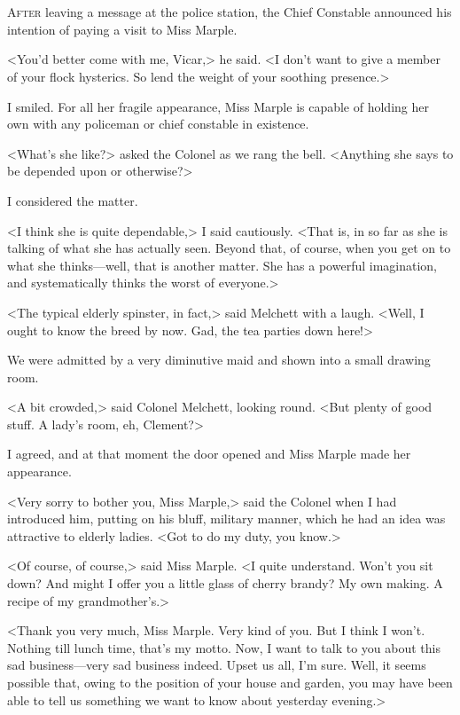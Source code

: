 \chapter[Chapter  \thechapter]{}


\lettrine{A}{fter} leaving a message at the police station, the Chief Constable announced his intention of paying a visit to Miss Marple.

\zz
<You'd better come with me, Vicar,> he said. <I don't want to give a member of your flock hysterics. So lend the weight of your soothing presence.>

I smiled. For all her fragile appearance, Miss Marple is capable of holding her own with any policeman or chief constable in existence.

<What's she like?> asked the Colonel as we rang the bell. <Anything she says to be depended upon or otherwise?>

I considered the matter.

<I think she is quite dependable,> I said cautiously. <That is, in so far as she is talking of what she has actually seen. Beyond that, of course, when you get on to what she thinks—well, that is another matter. She has a powerful imagination, and systematically thinks the worst of everyone.>

<The typical elderly spinster, in fact,> said Melchett with a laugh. <Well, I ought to know the breed by now. Gad, the tea parties down here!>

We were admitted by a very diminutive maid and shown into a small drawing room.

<A bit crowded,> said Colonel Melchett, looking round. <But plenty of good stuff. A lady's room, eh, Clement?>

I agreed, and at that moment the door opened and Miss Marple made her appearance.

<Very sorry to bother you, Miss Marple,> said the Colonel when I had introduced him, putting on his bluff, military manner, which he had an idea was attractive to elderly ladies. <Got to do my duty, you know.>

<Of course, of course,> said Miss Marple. <I quite understand. Won't you sit down? And might I offer you a little glass of cherry brandy? My own making. A recipe of my grandmother's.>

<Thank you very much, Miss Marple. Very kind of you. But I think I won't. Nothing till lunch time, that's my motto. Now, I want to talk to you about this sad business—very sad business indeed. Upset us all, I'm sure. Well, it seems possible that, owing to the position of your house and garden, you may have been able to tell us something we want to know about yesterday evening.>

